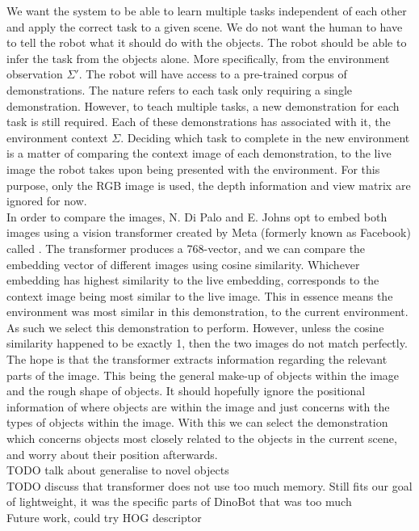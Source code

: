 We want the system to be able to learn multiple tasks independent of each other and apply the correct task to a given scene. We do not want the human to have to tell the robot what it should do with the objects. The robot should be able to infer the task from the objects alone. More specifically, from the environment observation $\Sigma'$.
The robot will have access to a pre-trained corpus of demonstrations. The  nature refers to each task only requiring a single demonstration. However, to teach multiple tasks, a new demonstration for each task is still required. Each of these demonstrations has associated with it, the environment context $\Sigma$. Deciding which task to complete in the new environment is a matter of comparing the context image of each demonstration, to the live image the robot takes upon being presented with the environment. For this purpose, only the RGB image is used, the depth information and view matrix are ignored for now.\\

In order to compare the images, N. Di Palo and E. Johns opt to embed both images using a vision transformer created by Meta (formerly known as Facebook) called  \cite{dino-paper}. The transformer produces a 768-vector, and we can compare the embedding vector of different images using cosine similarity. Whichever embedding has highest similarity to the live embedding, corresponds to the context image being most similar to the live image. This in essence means the environment was most similar in this demonstration, to the current environment. As such we select this demonstration to perform. However, unless the cosine similarity happened to be exactly 1, then the two images do not match perfectly. The hope is that the transformer extracts information regarding the relevant parts of the image. This being the general make-up of objects within the image and the rough shape of objects. It should hopefully ignore the positional information of where objects are within the image and just concerns with the types of objects within the image. With this we can select the demonstration which concerns objects most closely related to the objects in the current scene, and worry about their position afterwards.\\
TODO talk about generalise to novel objects\\
TODO discuss that transformer does not use too much memory. Still fits our goal of lightweight, it was the specific parts of DinoBot that was too much\\
Future work, could try HOG descriptor


